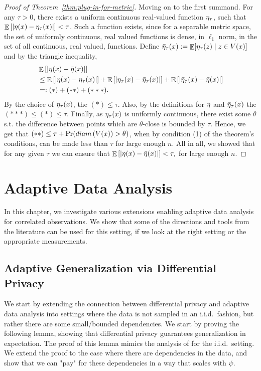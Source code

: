 \documentclass[12pt,a4paper,oneside,onecolumn]{book}
\begin{document}
\begin{proof}[Proof of Theorem~\ref{thm:plug-in-for-metric}]
Moving on to the first summand.
For any $\tau > 0$,
there exists a uniform continuous real-valued function $\eta_\tau$,
such that
$\mathop{\mathbb{E}}\left[\lvert\eta(x)-\eta_\tau(x)\rvert\right] < \tau$.
Such a function exists, since for a separable metric space, 
the set of uniformly continuous, real valued functions is dense, in $\ell_1$ norm, in the set of all  continuous, real valued, functions.
Define
$\bar{\eta}_\tau(x) := \mathop{\mathbb{E}}[\eta_\tau(z) \mid z\in V(x)]$
and by the triangle inequality,
\begin{align*}
    &\mathop{\mathbb{E}}\left[\lvert\eta(x)-\bar{\eta}(x)\rvert\right] \\
    &\leq   
    \mathop{\mathbb{E}}\left[\lvert\eta(x)-\eta_\tau(x)\rvert\right]
    +
    \mathop{\mathbb{E}}\left[\lvert\eta_\tau(x)-\bar{\eta}_\tau(x)\rvert\right] 
    +
    \mathop{\mathbb{E}}\left[\lvert\bar{\eta}_\tau(x)-\bar{\eta}(x)\rvert\right] \\
    & =: (*) + (**) + (***).
\end{align*}
By the choice of $\eta_\tau(x)$, the $(*) \leq \tau$.
Also, by the definitions for $\bar{\eta}$ and $\bar{\eta}_\tau(x)$
the $(***) \leq (*) \leq \tau$.
Finally, as $\eta_\tau(x)$ is uniformly continuous, there exist some $\theta$ 
s.t. the difference between points which are $\theta$-close is bounded by $\tau$. 
Hence, we get that
$(**) \leq \tau + \Pr(diam\left(V(x)\right) > \theta)$, when by condition (1) of the theorem's conditions, can be made less than $\tau$ for large enough $n$.
All in all, we showed that for any given $\tau$ we can ensure that $\mathop{\mathbb{E}}\left[\lvert\eta(x)-\bar{\eta}(x)\rvert\right] < \tau,$ for large enough $n$.
\end{proof}

\chapter{Adaptive Data Analysis}

In this chapter, we investigate various extensions enabling adaptive data analysis for correlated observations. 
We show that some of the directions and tools from the literature can be used for this setting, if we look at the right setting or the appropriate measurements.

\section{Adaptive Generalization via Differential Privacy}
\label{sec:learning-with-low}

We start by extending the connection between differential privacy and adaptive data analysis into settings where the data is not sampled in an i.i.d.\ fashion, but rather there are some small/bounded dependencies.
We start by proving the following lemma, showing that differential privacy guarantees generalization in expectation. %
The proof of this lemma mimics the analysis of \citet{bassily2016algorithmic} for the i.i.d.\ setting. We extend the proof to the case where there are dependencies in the data, and show that we can "pay" for these dependencies in a way that scales with $\psi$.\\
\end{document}
